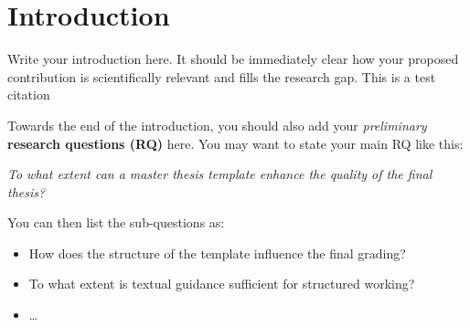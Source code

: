 \section{Introduction}
\label{sec:introduction}
Write your introduction here. It should be immediately clear how your proposed contribution is scientifically relevant and fills the research gap.
  This is a test citation \cite{Gruber1995}

Towards the end of the introduction, you should also add your \textit{preliminary} \textbf{research questions (RQ)} here. You may want to state your main RQ like this:

\noindent\textit{To what extent can a master thesis template enhance the quality of the final thesis?}

You can then list the sub-questions as:
\begin{itemize}
    \item How does the structure of the template influence the final grading?
    \item To what extent is textual guidance sufficient for structured working?
    \item \dots
\end{itemize}
